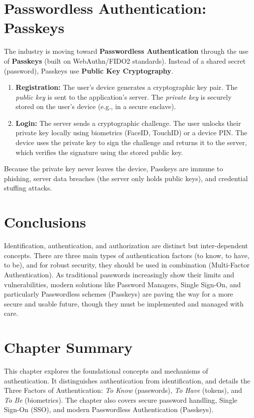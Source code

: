 \section{Passwordless Authentication: Passkeys}
The industry is moving toward \textbf{Passwordless Authentication} through the use of \textbf{Passkeys} (built on WebAuthn/FIDO2 standards). 
Instead of a shared secret (password), Passkeys use \textbf{Public Key Cryptography}. 
\begin{enumerate}
    \item \textbf{Registration:} The user's device generates a cryptographic key pair. The \textit{public key} is sent to the application's server. The \textit{private key} is securely stored on the user's device (e.g., in a secure enclave).
    \item \textbf{Login:} The server sends a cryptographic challenge. The user unlocks their private key locally using biometrics (FaceID, TouchID) or a device PIN. The device uses the private key to sign the challenge and returns it to the server, which verifies the signature using the stored public key.
\end{enumerate}
Because the private key never leaves the device, Passkeys are immune to phishing, server data breaches (the server only holds public keys), and credential stuffing attacks.

\section{Conclusions}
Identification, authentication, and authorization are distinct but inter-dependent concepts. There are three main types of authentication factors (to know, to have, to be), and for robust security, they should be used in combination (Multi-Factor Authentication). As traditional passwords increasingly show their limits and vulnerabilities, modern solutions like Password Managers, Single Sign-On, and particularly Passwordless schemes (Passkeys) are paving the way for a more secure and usable future, though they must be implemented and managed with care.

\section*{Chapter Summary}
This chapter explores the foundational concepts and mechanisms of authentication. It distinguishes authentication from identification, and details the Three Factors of Authentication: \textit{To Know} (passwords), \textit{To Have} (tokens), and \textit{To Be} (biometrics). The chapter also covers secure password handling, Single Sign-On (SSO), and modern Passwordless Authentication (Passkeys).

